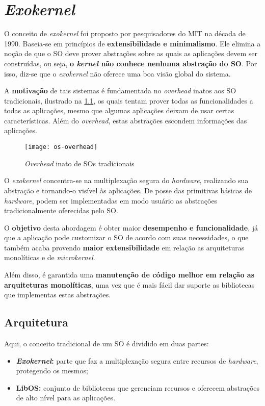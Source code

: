 \chapter{\textit{Exokernel}}
O conceito de \textit{exokernel} foi proposto por pesquisadores do MIT na década de 1990. Baseia-se em princípios de \textbf{extensibilidade e minimalismo}. Ele elimina a noção de que o SO deve prover abstrações sobre as quais as aplicações devem ser construídas, ou seja, \textbf{o \textit{kernel} não conhece nenhuma abstração do SO}. Por isso, diz-se que o \textit{exokernel} não oferece uma boa visão global do sistema.

A \textbf{motivação} de tais sistemas é fundamentada no \textit{overhead} inatos aos SO tradicionais, ilustrado na \ref{fig:os-overhead}, os quais tentam prover todas as funcionalidades a todas as aplicações, mesmo que algumas aplicações deixam de usar certas características. Além do \textit{overhead}, estas abstrações escondem informações das aplicações.

\begin{figure}[H]
  \centering
  \texttt{[image: os-overhead]}
  \caption{\textit{Overhead} inato de SOs tradicionais}
  \label{fig:os-overhead}
\end{figure}

O \textit{exokernel} concentra-se na multiplexação segura do \textit{hardware}, realizando sua abstração e tornando-o visível às aplicações. De posse das primitivas básicas de \textit{hardware}, podem ser implementadas em modo usuário as abstrações tradicionalmente oferecidas pelo SO.

O \textbf{objetivo} desta abordagem é obter maior \textbf{desempenho e funcionalidade}, já que a aplicação pode customizar o SO de acordo com suas necessidades, o que também acaba provendo \textbf{maior extensibilidade} em relação as arquiteturas monolíticas e de \textit{microkernel}.

Além disso, é garantida uma \textbf{manutenção de código melhor em relação as arquiteturas monolíticas}, uma vez que é mais fácil dar suporte as bibliotecas que implementas estas abstrações.

\section{Arquitetura}
Aqui, o conceito tradicional de um SO é dividido em duas partes:
\begin{itemize}
  \item \textbf{\textit{Exokernel}:} parte que faz a multiplexação segura entre recursos de \textit{hardware}, protegendo os mesmos;

  \item \textbf{LibOS:} conjunto de bibliotecas que gerenciam recursos e oferecem abstrações de alto nível para as aplicações.
\end{itemize}

